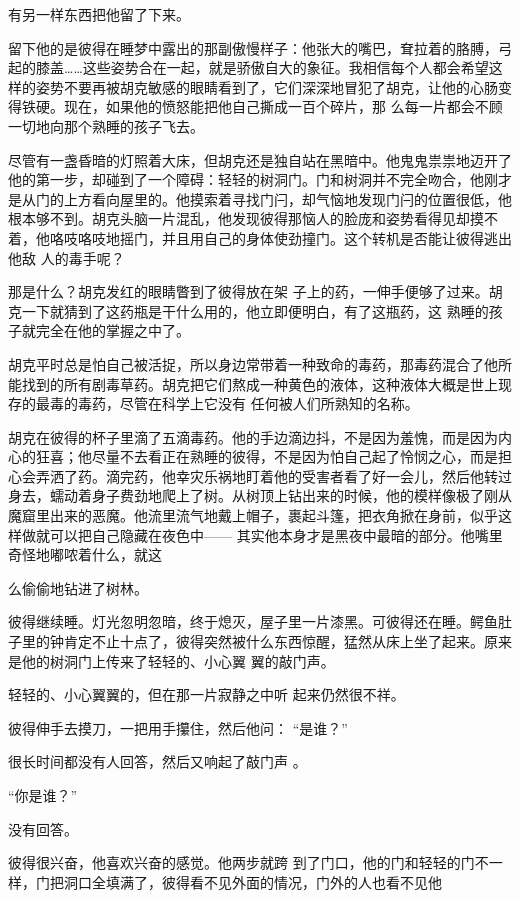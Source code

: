 \documentclass{article}
\begin{document}
有另一样东西把他留了下来。 

留下他的是彼得在睡梦中露出的那副傲慢样子：他张大的嘴巴，耷拉着的胳膊，弓起的膝盖……这些姿势合在一起，就是骄傲自大的象征。我相信每个人都会希望这样的姿势不要再被胡克敏感的眼睛看到了，它们深深地冒犯了胡克，让他的心肠变得铁硬。现在，如果他的愤怒能把他自己撕成一百个碎片，那
么每一片都会不顾一切地向那个熟睡的孩子飞去。 

尽管有一盏昏暗的灯照着大床，但胡克还是独自站在黑暗中。他鬼鬼祟祟地迈开了他的第一步，却碰到了一个障碍：轻轻的树洞门。门和树洞并不完全吻合，他刚才是从门的上方看向屋里的。他摸索着寻找门闩，却气恼地发现门闩的位置很低，他根本够不到。胡克头脑一片混乱，他发现彼得那恼人的脸庞和姿势看得见却摸不着，他咯吱咯吱地摇门，并且用自己的身体使劲撞门。这个转机是否能让彼得逃出他敌
人的毒手呢？ 

那是什么？胡克发红的眼睛瞥到了彼得放在架
\newpage
子上的药，一伸手便够了过来。胡克一下就猜到了这药瓶是干什么用的，他立即便明白，有了这瓶药，这
熟睡的孩子就完全在他的掌握之中了。 

胡克平时总是怕自己被活捉，所以身边常带着一种致命的毒药，那毒药混合了他所能找到的所有剧毒草药。胡克把它们熬成一种黄色的液体，这种液体大概是世上现存的最毒的毒药，尽管在科学上它没有
任何被人们所熟知的名称。 

胡克在彼得的杯子里滴了五滴毒药。他的手边滴边抖，不是因为羞愧，而是因为内心的狂喜；他尽量不去看正在熟睡的彼得，不是因为怕自己起了怜悯之心，而是担心会弄洒了药。滴完药，他幸灾乐祸地盯着他的受害者看了好一会儿，然后他转过身去，蠕动着身子费劲地爬上了树。从树顶上钻出来的时候，他的模样像极了刚从魔窟里出来的恶魔。他流里流气地戴上帽子，裹起斗篷，把衣角掀在身前，似乎这样做就可以把自己隐藏在夜色中—— 其实他本身才是黑夜中最暗的部分。他嘴里奇怪地嘟哝着什么，就这

\newpage
么偷偷地钻进了树林。 

彼得继续睡。灯光忽明忽暗，终于熄灭，屋子里一片漆黑。可彼得还在睡。鳄鱼肚子里的钟肯定不止十点了，彼得突然被什么东西惊醒，猛然从床上坐了起来。原来是他的树洞门上传来了轻轻的、小心翼
翼的敲门声。 

轻轻的、小心翼翼的，但在那一片寂静之中听
起来仍然很不祥。 

彼得伸手去摸刀，一把用手攥住，然后他问：
“是谁？” 

很长时间都没有人回答，然后又响起了敲门声
。 


“你是谁？” 


没有回答。 

彼得很兴奋，他喜欢兴奋的感觉。他两步就跨
\newpage
到了门口，他的门和轻轻的门不一样，门把洞口全填满了，彼得看不见外面的情况，门外的人也看不见他
\end{document}
